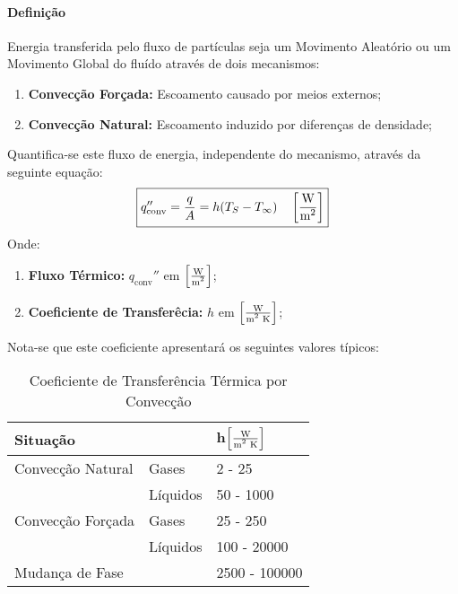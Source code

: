 \documentclass{article}
\begin{document}
            \paragraph{Definição}Energia transferida pelo fluxo de partículas seja um Movimento Aleatório ou um Movimento Global do fluído através de dois mecanismos:
                \begin{enumerate}[noitemsep]
                    \item \textbf{Convecção Forçada:} Escoamento causado por meios externos; 
                    \item \textbf{Convecção Natural:} Escoamento induzido por diferenças de densidade; 
                \end{enumerate}
            Quantifica-se este fluxo de energia, independente do mecanismo, através da seguinte equação:
                \begin{equation}
                    \boxed{
                        q_{\text{conv}}'' = \frac{q}{A} = h (T_{S} - T_{\infty})
                        \quad 
                        \left[\frac{\text{W}}{\text{m\textsuperscript{2}}}\right]
                    }
                \end{equation}
            Onde:
                \begin{enumerate}[noitemsep, rightmargin = \leftmargin]
                    \item \textbf{Fluxo Térmico:} $q_{\text{conv}}''$ em $\left[\frac{\text{W}}{\text{m\textsuperscript{2}}}\right]$;

                    \item \textbf{Coeficiente de Transferêcia:} $h$ em $\left[\frac{\text{W}}{\text{m\textsuperscript{2} K}}\right]$;
                \end{enumerate}
            Nota-se que este coeficiente apresentará os seguintes valores típicos:
                \begin{table}[H]
                    \centering
                    \begin{tabular}{lll}\hline
                        Situação          &          & h\;$\left[\frac{\text{W}}{\text{m\textsuperscript{2} K}}\right]$\\\hline
                        Convecção Natural & Gases    & 2 - 25\\
                                          & Líquidos & 50 - 1000\\
                        Convecção Forçada & Gases    & 25 - 250\\
                                          & Líquidos & 100 - 20000\\
                        Mudança de Fase   &          & 2500 - 100000\\\hline
                    \end{tabular}
                    \caption{Coeficiente de Transferência Térmica por Convecção}
                    \label{table:convectionConstant}
                \end{table}\noindent
\end{document}
